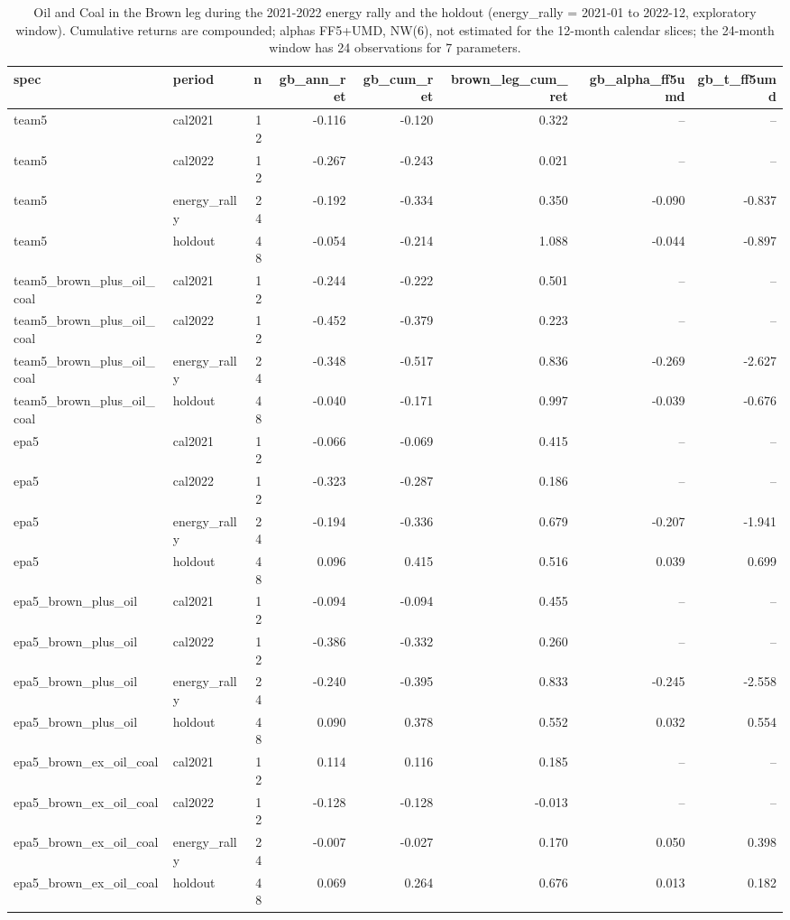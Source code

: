 \begin{table}
\caption{Oil and Coal in the Brown leg during the 2021-2022 energy rally and the holdout (energy\_rally = 2021-01 to 2022-12, exploratory window). Cumulative returns are compounded; alphas FF5+UMD, NW(6), not estimated for the 12-month calendar slices; the 24-month window has 24 observations for 7 parameters.}
\label{tab:m4_energy}
\begin{tabular}{llrrrrrr}
\toprule
spec & period & n & gb\_ann\_ret & gb\_cum\_ret & brown\_leg\_cum\_ret & gb\_alpha\_ff5umd & gb\_t\_ff5umd \\
\midrule
team5 & cal2021 & 12 & -0.116 & -0.120 & 0.322 & -- & -- \\
team5 & cal2022 & 12 & -0.267 & -0.243 & 0.021 & -- & -- \\
team5 & energy\_rally & 24 & -0.192 & -0.334 & 0.350 & -0.090 & -0.837 \\
team5 & holdout & 48 & -0.054 & -0.214 & 1.088 & -0.044 & -0.897 \\
team5\_brown\_plus\_oil\_coal & cal2021 & 12 & -0.244 & -0.222 & 0.501 & -- & -- \\
team5\_brown\_plus\_oil\_coal & cal2022 & 12 & -0.452 & -0.379 & 0.223 & -- & -- \\
team5\_brown\_plus\_oil\_coal & energy\_rally & 24 & -0.348 & -0.517 & 0.836 & -0.269 & -2.627 \\
team5\_brown\_plus\_oil\_coal & holdout & 48 & -0.040 & -0.171 & 0.997 & -0.039 & -0.676 \\
epa5 & cal2021 & 12 & -0.066 & -0.069 & 0.415 & -- & -- \\
epa5 & cal2022 & 12 & -0.323 & -0.287 & 0.186 & -- & -- \\
epa5 & energy\_rally & 24 & -0.194 & -0.336 & 0.679 & -0.207 & -1.941 \\
epa5 & holdout & 48 & 0.096 & 0.415 & 0.516 & 0.039 & 0.699 \\
epa5\_brown\_plus\_oil & cal2021 & 12 & -0.094 & -0.094 & 0.455 & -- & -- \\
epa5\_brown\_plus\_oil & cal2022 & 12 & -0.386 & -0.332 & 0.260 & -- & -- \\
epa5\_brown\_plus\_oil & energy\_rally & 24 & -0.240 & -0.395 & 0.833 & -0.245 & -2.558 \\
epa5\_brown\_plus\_oil & holdout & 48 & 0.090 & 0.378 & 0.552 & 0.032 & 0.554 \\
epa5\_brown\_ex\_oil\_coal & cal2021 & 12 & 0.114 & 0.116 & 0.185 & -- & -- \\
epa5\_brown\_ex\_oil\_coal & cal2022 & 12 & -0.128 & -0.128 & -0.013 & -- & -- \\
epa5\_brown\_ex\_oil\_coal & energy\_rally & 24 & -0.007 & -0.027 & 0.170 & 0.050 & 0.398 \\
epa5\_brown\_ex\_oil\_coal & holdout & 48 & 0.069 & 0.264 & 0.676 & 0.013 & 0.182 \\
\bottomrule
\end{tabular}
\end{table}
